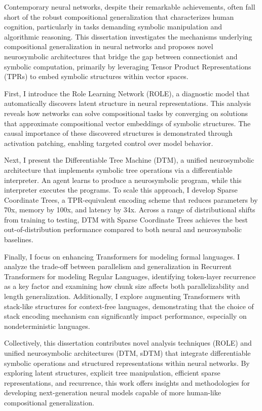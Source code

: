 Contemporary neural networks, despite their remarkable achievements, often fall short of the robust compositional generalization that characterizes human cognition, particularly in tasks demanding symbolic manipulation and algorithmic reasoning. This dissertation investigates the mechanisms underlying compositional generalization in neural networks and proposes novel neurosymbolic architectures that bridge the gap between connectionist and symbolic computation, primarily by leveraging Tensor Product Representations (TPRs) to embed symbolic structures within vector spaces.

First, I introduce the Role Learning Network (ROLE), a diagnostic model that automatically discovers latent structure in neural representations. This analysis reveals how networks can solve compositional tasks by converging on solutions that approximate compositional vector embeddings of symbolic structures. The causal importance of these discovered structures is demonstrated through activation patching, enabling targeted control over model behavior.

Next, I present the Differentiable Tree Machine (DTM), a unified neurosymbolic architecture that implements symbolic tree operations via a differentiable interpreter. An agent learns to produce a neurosymbolic program, while this interpreter executes the programs. To scale this approach, I develop Sparse Coordinate Trees, a TPR-equivalent encoding scheme that  reduces parameters by 70x, memory by 100x, and latency by 34x. Across a range of distributional shifts from training to testing, DTM with Sparse Coordinate Trees achieves the best out-of-distribution performance compared to both neural and neurosymbolic baselines.

Finally, I focus on enhancing Transformers for modeling formal languages. I analyze the trade-off between parallelism and generalization in Recurrent Transformers for modeling Regular Languages, identifying token-layer recurrence as a key factor and examining how chunk size affects both parallelizability and length generalization. Additionally, I explore augmenting Transformers with stack-like structures for context-free languages, demonstrating that the choice of stack encoding mechanism can significantly impact performance, especially on nondeterministic languages.

Collectively, this dissertation contributes novel analysis techniques (ROLE) and unified neurosymbolic architectures (DTM, sDTM) that integrate differentiable symbolic operations and structured representations within neural networks. By exploring latent structures, explicit tree manipulation, efficient sparse representations, and recurrence, this work offers insights and methodologies for developing next-generation neural models capable of more human-like compositional generalization.

